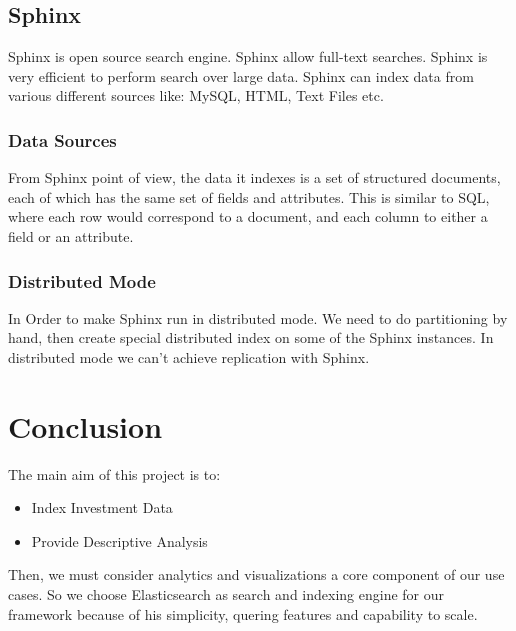 \subsection{Sphinx}
Sphinx is open source search engine. Sphinx allow full-text searches. Sphinx is very efficient to perform search over large data. Sphinx can index data from various different sources like: MySQL, HTML, Text Files etc.

\subsubsection{Data Sources}
From Sphinx point of view, the data it indexes is a set of structured documents, each of which has the same set of fields and attributes. 
This is similar to SQL, where each row would correspond to a document, and each column to either a field or an attribute.

\subsubsection{Distributed Mode}
In Order to make Sphinx run in distributed mode. We need to do partitioning by hand, then create special distributed index on some of the Sphinx instances. 
In distributed mode we can't achieve replication with Sphinx.

\section{Conclusion}
The main aim of this project is to:
\begin{itemize}
    \item Index Investment Data
    \item Provide Descriptive Analysis
\end{itemize}
Then, we must consider analytics and visualizations a core component of our use cases.
So we choose Elasticsearch as search and indexing engine for our framework because of his simplicity, quering features 
and capability to scale.